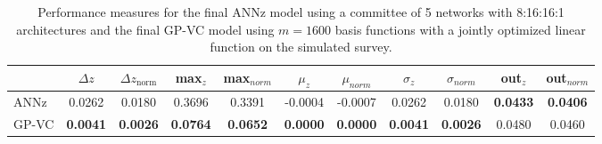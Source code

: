 \documentclass[useAMS,usenatbib,fleqn]{mn2e}
\begin{document}
 \begin{table}
\caption{Performance measures for the final {\sc ANNz} model using a committee of 5 networks with 8:16:16:1 architectures and the final GP-VC model using $m=1600$ basis functions with a jointly optimized linear function on the simulated survey.}
\begin{center}
\begin{tabular}{| l | c | c |  c | c |  c | c |  c | c |  c | c | }
     				&	$\Delta z$	&	$\Delta z_\textrm{norm}$	&	max$_{z}$ & max$_{norm}$		&	$\mu_{z}$&	$\mu_{norm}$	& $\sigma_{z}$ & $\sigma_{norm}$ & out$_{z}$&out$_{norm}$\\	\hline
	{\sc ANNz}		&	0.0262	&	0.0180		&	0.3696		&	0.3391&	-0.0004		&	-0.0007&	0.0262		&	0.0180&	\textbf{0.0433}		&	\textbf{0.0406}\\
	GP-VC		&	\textbf{0.0041} 	&	\textbf{0.0026}	&	\textbf{0.0764}		&	\textbf{0.0652}&	\textbf{0.0000}			&	\textbf{0.0000}&	\textbf{0.0041}		&	\textbf{0.0026}&	0.0480	&	0.0460\\\hline
  \end{tabular}
\end{center}
\label{table-GP-ANN-simulated}
\end{table}
\end{document}
